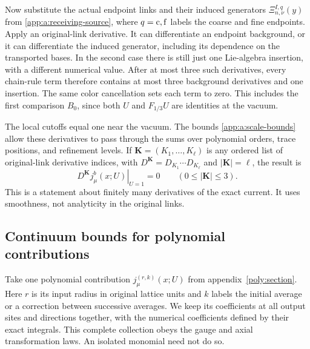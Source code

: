 \documentclass[11pt,a4paper]{article}
\theoremstyle{remark}
\begin{document}
Now substitute the actual endpoint links and their induced generators
$\Xi^{I,q}_{n,\nu}(y)$ from \eqref{app:a:receiving-source}, where
$q={\rm c},{\rm f}$ labels the coarse and fine endpoints. Apply an
original-link derivative. It can differentiate an endpoint background,
or it can differentiate the induced generator, including its dependence
on the transported bases. In the second case there is still just one
Lie-algebra insertion, with a different numerical value. After at most
three such derivatives, every chain-rule term therefore contains at
most three background derivatives and one insertion. The same color
cancellation sets each term to zero. This includes the first comparison
$B_0$, since both $U$ and $F_{1/3}U$ are identities at the vacuum.

The local cutoffs equal one near the vacuum. The bounds
\eqref{app:a:scale-bounds} allow these derivatives to pass through the
sums over polynomial orders, trace positions, and refinement levels.
If $\boldsymbol K=(K_1,\ldots,K_\ell)$ is any ordered list of
original-link derivative indices, with
$D^{\boldsymbol K}=D_{K_1}\cdots D_{K_\ell}$ and
$|\boldsymbol K|=\ell$, the result is
\begin{equation}
 \left.D^{\boldsymbol K}j_\mu^b(x;U)\right|_{U=1}=0
 \qquad(0\le|\boldsymbol K|\le3).
\end{equation}
This is a statement about finitely many derivatives of the exact
current. It uses smoothness, not analyticity in the original links.

\subsection{Continuum bounds for polynomial contributions}

Take one polynomial contribution $j_\mu^{(r,k)}(x;U)$ from
appendix~\ref{poly:section}. Here $r$ is its input radius in original
lattice units and $k$ labels the initial average or a correction between
successive averages. We keep its coefficients at all output sites and
directions together, with the numerical coefficients defined by their
exact integrals. This complete collection obeys the gauge and axial
transformation laws. An isolated monomial need not do so.
\end{document}
